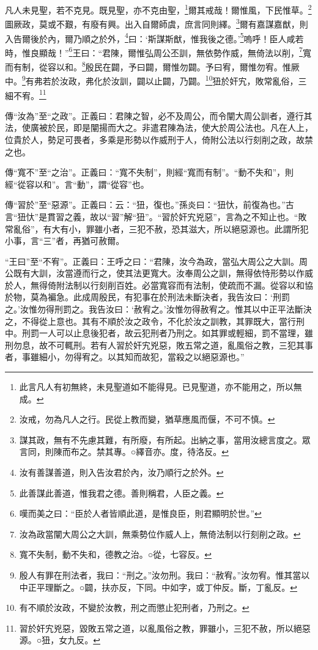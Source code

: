 凡人未見聖，若不克見。既見聖，亦不克由聖，\footnote{此言凡人有初無終，未見聖道如不能得見。已見聖道，亦不能用之，所以無成。}爾其戒哉！爾惟風，下民惟草。\footnote{汝戒，勿為凡人之行。民從上教而變，猶草應風而偃，不可不慎。}圖厥政，莫或不艱，有廢有興。出入自爾師虞，庶言同則繹。\footnote{謀其政，無有不先慮其難，有所廢，有所起。出納之事，當用汝總言度之。眾言同，則陳而布之。禁其專。○繹音亦。度，待洛反。}爾有嘉謀嘉猷，則入告爾後於內，爾乃順之於外，\footnote{汝有善謀善道，則入告汝君於內，汝乃順行之於外。}曰：‘斯謀斯猷，惟我後之德。’\footnote{此善謀此善道，惟我君之德。善則稱君，人臣之義。}嗚呼！臣人咸若時，惟良顯哉！”\footnote{嘆而美之曰：“臣於人者皆順此道，是惟良臣，則君顯明於世。”}王曰：“君陳，爾惟弘周公丕訓，無依勢作威，無倚法以削，\footnote{汝為政當闡大周公之大訓，無乘勢位作威人上，無倚法制以行刻削之政。}寬而有制，從容以和。\footnote{寬不失制，動不失和，德教之治。○從，七容反。}殷民在闢，予曰闢，爾惟勿闢。予曰宥，爾惟勿宥。惟厥中。\footnote{殷人有罪在刑法者，我曰：“刑之。”汝勿刑。我曰：“赦宥。”汝勿宥。惟其當以中正平理斷之。○闢，扶亦反，下同。中如字，或丁仲反。斷，丁亂反。}有弗若於汝政，弗化於汝訓，闢以止闢，乃闢。\footnote{有不順於汝政，不變於汝教，刑之而懲止犯刑者，乃刑之。}狃於奸宄，敗常亂俗，三細不宥。\footnote{習於奸宄兇惡，毀敗五常之道，以亂風俗之教，罪雖小，三犯不赦，所以絕惡源。○狃，女九反。}


{\noindent\zhuan{}\fzbyks 傳“汝為”至“之政”。正義曰：君陳之智，必不及周公，而令闡大周公訓者，遵行其法，使廣被於民，即是闡揚而大之。非遣君陳為法，使大於周公法也。凡在人上，位貴於人，勢足可畏者，多乘是形勢以作威刑于人，倚附公法以行刻削之政，故禁之也。 \par}

{\noindent\zhuan{}\fzbyks 傳“寬不”至“之治”。正義曰：“寬不失制”，則經“寬而有制”。“動不失和”，則經“從容以和”。言“動”，謂“從容”也。 \par}

{\noindent\zhuan{}\fzbyks 傳“習於”至“惡源”。正義曰：云：“狃，復也。”孫炎曰：“狃忕，前復為也。”古言“狃忕”是貫習之義，故以“習”解“狃”。“習於奸宄兇惡”，言為之不知止也。“敗常亂俗”，有大有小，罪雖小者，三犯不赦，恐其滋大，所以絕惡源也。此謂所犯小事，言“三”者，再猶可赦爾。 \par}

{\noindent\shu{}\fzkt “王曰”至“不宥”。正義曰：王呼之曰：“君陳，汝今為政，當弘大周公之大訓。周公既有大訓，汝當遵而行之，使其法更寬大。汝奉周公之訓，無得依恃形勢以作威於人，無得倚附法制以行刻削百姓。必當寬容而有法制，使疏而不漏。從容以和協於物，莫為褊急。此成周殷民，有犯事在於刑法未斷決者，我告汝曰：‘刑罰之。’汝惟勿得刑罰之。我告汝曰：‘赦宥之。’汝惟勿得赦宥之。惟其以中正平法斷決之，不得從上意也。其有不順於汝之政令，不化於汝之訓教，其罪既大，當行刑中。刑罰一人可以止息後犯者，故云犯刑者乃刑之。如其罪或輕細，罰不當理，雖刑勿息，故不可輒刑。若有人習於奸宄兇惡，敗五常之道，亂風俗之教，三犯其事者，事雖細小，勿得宥之。以其知而故犯，當殺之以絕惡源也。” \par}

